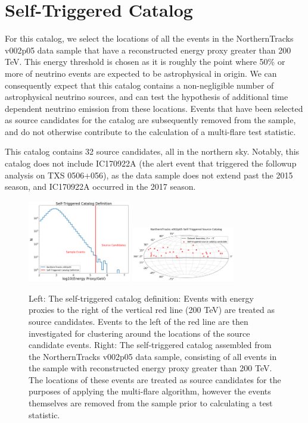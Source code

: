 \section{Self-Triggered Catalog}
For this catalog, we select the locations of all the events in the NorthernTracks v002p05 data sample that have a reconstructed energy proxy greater than 200 TeV. This energy threshold is chosen as it is roughly the point where 50\% or more of neutrino events are expected to be astrophysical in origin. We can consequently expect that this catalog contains a non-negligible number of astrophysical neutrino sources, and can test the hypothesis of additional time dependent neutrino emission from these locations. Events that have been selected as source candidates for the catalog are subsequently removed from the sample, and do not otherwise contribute to the calculation of a multi-flare test statistic. 

This catalog contains 32 source candidates, all in the northern sky. Notably, this catalog does not include IC170922A (the alert event that triggered the followup analysis on TXS 0506+056), as the data sample does not extend past the 2015 season, and IC170922A occurred in the 2017 season. 

\begin{figure}[h]
\centering
\includegraphics[width=0.4\textwidth]{figs/stcat_def.png}
\includegraphics[width=0.4\textwidth]{figs/Selftriggeredcat.png}
\caption{Left: The self-triggered catalog definition: Events with energy proxies to the right of the vertical red line (200 TeV) are treated as source candidates. Events to the left of the red line are then investigated for clustering around the locations of the source candidate events. Right: The self-triggered catalog assembled from the NorthernTracks v002p05 data sample, consisting of all events in the sample with reconstructed energy proxy greater than 200 TeV. The locations of these events are treated as source candidates for the purposes of applying the multi-flare algorithm, however the events themselves are removed from the sample prior to calculating a test statistic.}
\label{fig:stcat}
\end{figure}

